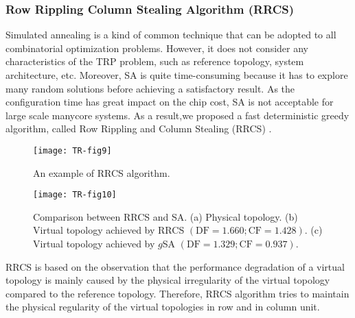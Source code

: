 \subsubsection{Row Rippling Column Stealing Algorithm (RRCS)}
Simulated annealing is a kind of common technique that can be adopted to all combinatorial optimization problems. However, it does not consider any characteristics of the TRP problem, such as reference topology, system architecture, etc. Moreover, SA is quite time-consuming because it has to explore many random solutions before achieving a satisfactory result. As the configuration time has great impact on the chip cost, SA is not acceptable for large scale manycore systems. As a result,we proposed a fast deterministic greedy algorithm, called Row Rippling and Column Stealing (RRCS) \cite{zhang2007fault}.

\begin{figure}[t]
      \centering
        \texttt{[image: TR-fig9]}
          \caption{An example of RRCS algorithm.}
             \label{fig9}
\end{figure}

\begin{figure}[h]
      \centering
        \texttt{[image: TR-fig10]}
          \caption{Comparison between RRCS and SA. (a) Physical topology. (b) Virtual topology achieved by RRCS $(\mathrm{DF}=1.660 ; \mathrm{CF}=1.428)$. (c) Virtual topology achieved by  $g$SA $(\mathrm{DF}=1.329 ; \mathrm{CF}=0.937)$. }
        \label{fig10}
\end{figure}


RRCS is based on the observation that the performance degradation of a virtual topology is mainly caused by the physical irregularity of the virtual topology compared to the reference topology. Therefore, RRCS algorithm tries to maintain the physical regularity of the virtual topologies in row and in column unit.

